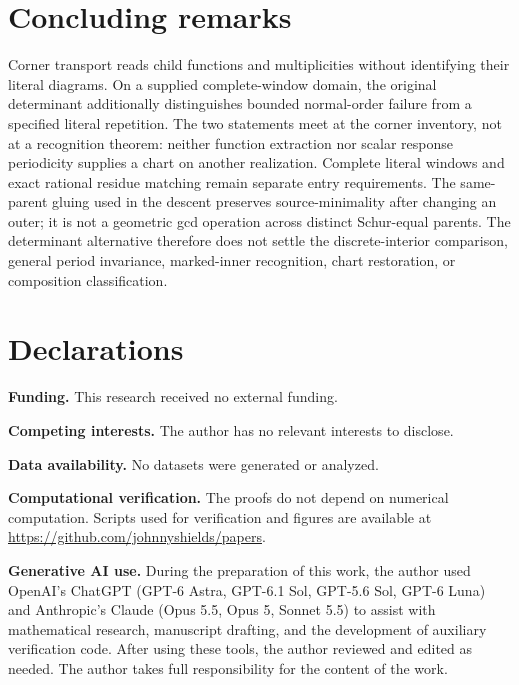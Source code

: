 \documentclass[11pt,a4paper]{amsart}
\numberwithin{equation}{section}
\theoremstyle{plain}
\theoremstyle{definition}
\begin{document}
\section{Concluding remarks}\label{sec:concluding}

Corner transport reads child functions and multiplicities without identifying their literal diagrams.  On a supplied complete-window domain, the original determinant additionally distinguishes bounded normal-order failure from a specified literal repetition.  The two statements meet at the corner inventory, not at a recognition theorem: neither function extraction nor scalar response periodicity supplies a chart on another realization.  Complete literal windows and exact rational residue matching remain separate entry requirements.  The same-parent gluing used in the descent preserves source-minimality after changing an outer; it is not a geometric gcd operation across distinct Schur-equal parents.  The determinant alternative therefore does not settle the discrete-interior comparison, general period invariance, marked-inner recognition, chart restoration, or composition classification.

\section*{Declarations}
{\footnotesize
\noindent\textbf{Funding.} This research received no external funding.

\smallskip
\noindent\textbf{Competing interests.} The author has no relevant interests to disclose.

\smallskip
\noindent\textbf{Data availability.} No datasets were generated or analyzed.

\smallskip
\noindent\textbf{Computational verification.} The proofs do not depend on numerical computation.  Scripts used for verification and figures are available at \url{https://github.com/johnnyshields/papers}.

\smallskip
\noindent\textbf{Generative AI use.} During the preparation of this work, the author used OpenAI's ChatGPT (GPT-6 Astra, GPT-6.1 Sol, GPT-5.6 Sol, GPT-6 Luna) and Anthropic's Claude (Opus 5.5, Opus 5, Sonnet 5.5) to assist with mathematical research, manuscript drafting, and the development of auxiliary verification code.  After using these tools, the author reviewed and edited as needed.  The author takes full responsibility for the content of the work.\par}
\end{document}
